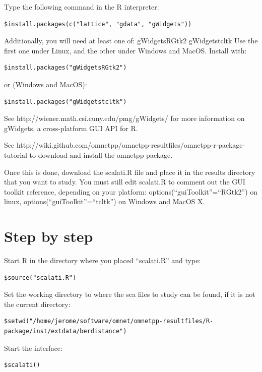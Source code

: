 Type the following command in the R interpreter:

\begin{verbatim}
$install.packages(c("lattice", "gdata", "gWidgets"))
\end{verbatim}

Additionally, you will need at least one of: gWidgetsRGtk2 gWidgetstcltk
Use the first one under Linux, and the other under Windows and MacOS. Install with:

\begin{verbatim}
$install.packages("gWidgetsRGtk2")
\end{verbatim}

or (Windows and MacOS):

\begin{verbatim}
$install.packages("gWidgetstcltk")
\end{verbatim}

See http://wiener.math.csi.cuny.edu/pmg/gWidgets/ for more information on gWidgets, a cross-platform GUI API for R.

See http://wiki.github.com/omnetpp/omnetpp-resultfiles/omnetpp-r-package-tutorial to download and install the omnetpp package.

Once this is done, download the scalati.R file and place it in the results directory that you want to study. You must still edit scalati.R to comment out the GUI toolkit reference, depending on your platform: options(“guiToolkit”=“RGtk2”) on linux, options(“guiToolkit”=“tcltk”) on Windows and MacOS X.


\section{Step by step}

Start R in the directory where you placed “scalati.R” and type:

\begin{verbatim}
$source("scalati.R")
\end{verbatim}

Set the working directory to where the sca files to study can be found, if it is not the current directory:

\begin{verbatim}
$setwd("/home/jerome/software/omnet/omnetpp-resultfiles/R-package/inst/extdata/berdistance")
\end{verbatim}

Start the interface:

\begin{verbatim}
$scalati()
\end{verbatim}

